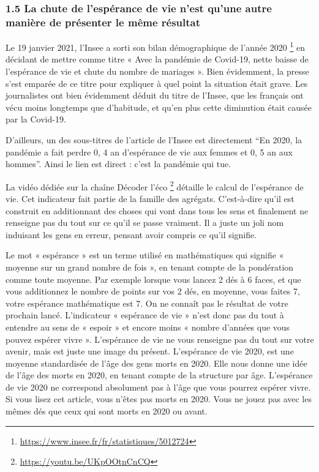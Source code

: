 \documentclass[
]{article}
\begin{document}
\hypertarget{la-chute-de-lespuxe9rance-de-vie-nest-quune-autre-maniuxe8re-de-pruxe9senter-le-muxeame-ruxe9sultat}{%
\subsubsection{1.5 La chute de l'espérance de vie n'est qu'une autre
manière de présenter le même
résultat}\label{la-chute-de-lespuxe9rance-de-vie-nest-quune-autre-maniuxe8re-de-pruxe9senter-le-muxeame-ruxe9sultat}}

Le 19 janvier 2021, l'Insee a sorti son bilan démographique de l'année
2020 \footnote{\url{https://www.insee.fr/fr/statistiques/5012724}} en
décidant de mettre comme titre « Avec la pandémie de Covid-19, nette
baisse de l'espérance de vie et chute du nombre de mariages ». Bien
évidemment, la presse s'est emparée de ce titre pour expliquer à quel
point la situation était grave. Les journalistes ont bien évidemment
déduit du titre de l'Insee, que les français ont vécu moins longtemps
que d'habitude, et qu'en plus cette diminution était causée par la
Covid-19.

D'ailleurs, un des sous-titres de l'article de l'Insee est directement
``En 2020, la pandémie a fait perdre 0, 4 an d'espérance de vie aux
femmes et 0, 5 an aux hommes''. Ainsi le lien est direct : c'est la
pandémie qui tue.

La vidéo dédiée sur la chaîne Décoder l'éco \footnote{\url{https://youtu.be/UKpOOtnCnCQ}}
détaille le calcul de l'espérance de vie. Cet indicateur fait partie de
la famille des agrégats. C'est-à-dire qu'il est construit en
additionnant des choses qui vont dans tous les sens et finalement ne
renseigne pas du tout sur ce qu'il se passe vraiment. Il a juste un joli
nom induisant les gens en erreur, pensant avoir compris ce qu'il
signifie.

Le mot « espérance » est un terme utilisé en mathématiques qui signifie
« moyenne sur un grand nombre de fois », en tenant compte de la
pondération comme toute moyenne. Par exemple lorsque vous lancez 2 dés à
6 faces, et que vous additionnez le nombre de points sur vos 2 dés, en
moyenne, vous faites 7, votre espérance mathématique est 7. On ne
connaît pas le résultat de votre prochain lancé. L'indicateur «
espérance de vie » n'est donc pas du tout à entendre au sens de « espoir
» et encore moins « nombre d'années que vous pouvez espérer vivre ».
L'espérance de vie ne vous renseigne pas du tout sur votre avenir, mais
est juste une image du présent. L'espérance de vie 2020, est une moyenne
standardisée de l'âge des gens morts en 2020. Elle nous donne une idée
de l'âge des morts en 2020, en tenant compte de la structure par âge.
L'espérance de vie 2020 ne correspond absolument pas à l'âge que vous
pourrez espérer vivre. Si vous lisez cet article, vous n'êtes pas morts
en 2020. Vous ne jouez pas avec les mêmes dés que ceux qui sont morts en
2020 ou avant.
\end{document}
